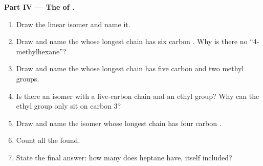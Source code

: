 \begin{problem}
\medskip
\noindent\textbf{Part IV --- The  of .}
\begin{enumerate}[resume]
  \item Draw the linear isomer and name it.
  \item Draw and name the  whose longest chain has six carbon
        . Why is there no ``4-methylhexane''?
  \item Draw and name the  whose longest chain has five carbon
         and two methyl groups.
  \item Is there an isomer with a five-carbon chain and an ethyl group?
        Why can the ethyl group only sit on carbon 3?
  \item Draw and name the isomer whose longest chain has four carbon
        .
  \item Count all the  found.
  \item State the final answer: how many  does
        heptane have, itself included?
\end{enumerate}
\end{problem}
